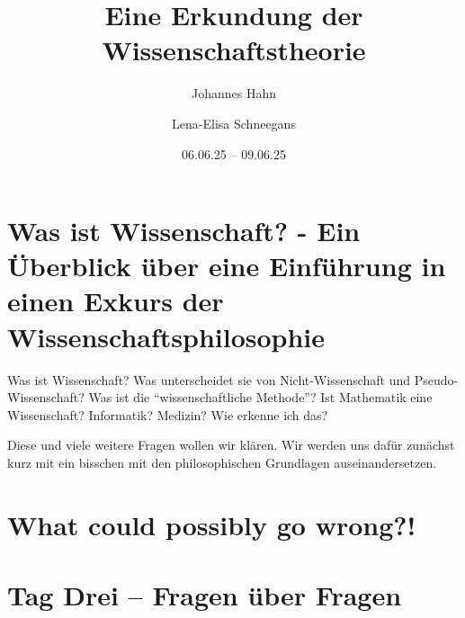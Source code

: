 \documentclass[fontsize=11pt,fleqn,a4paper]{scrartcl}
\author{Johannes Hahn \and Lena-Elisa Schneegans}
\title{Eine Erkundung der Wissenschaftstheorie}
\date{06.06.25 -- 09.06.25}
\begin{document}
\maketitle

\tableofcontents
\pagebreak


\section{Was ist Wissenschaft? - Ein Überblick über eine Einführung in einen Exkurs der Wissenschaftsphilosophie}


Was ist Wissenschaft? Was unterscheidet sie von Nicht-Wissenschaft und Pseudo-Wissenschaft? Was ist die
\enquote{wissenschaftliche Methode}? Ist Mathematik eine Wissenschaft? Informatik? Medizin? Wie erkenne ich das?

Diese und viele weitere Fragen wollen wir klären. Wir werden uns dafür zunächst kurz mit ein bisschen mit den
philosophischen Grundlagen auseinandersetzen.

\pagebreak


\section{What could possibly go wrong?!}



\pagebreak


\section{Tag Drei -- Fragen über Fragen}


\pagebreak
\printbibliography
\end{document}
